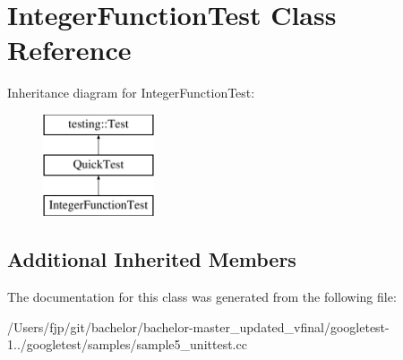 \hypertarget{class_integer_function_test}{}\section{Integer\+Function\+Test Class Reference}
\label{class_integer_function_test}
Inheritance diagram for Integer\+Function\+Test\+:\begin{figure}[H]
\begin{center}
\leavevmode
\includegraphics[height=3.000000cm]{class_integer_function_test}
\end{center}
\end{figure}
\subsection*{Additional Inherited Members}


The documentation for this class was generated from the following file\+:\begin{DoxyCompactItemize}
\item 
/\+Users/fjp/git/bachelor/bachelor-\/master\+\_\+updated\+\_\+vfinal/googletest-\/1../googletest/samples/sample5\+\_\+unittest.\+cc\end{DoxyCompactItemize}
